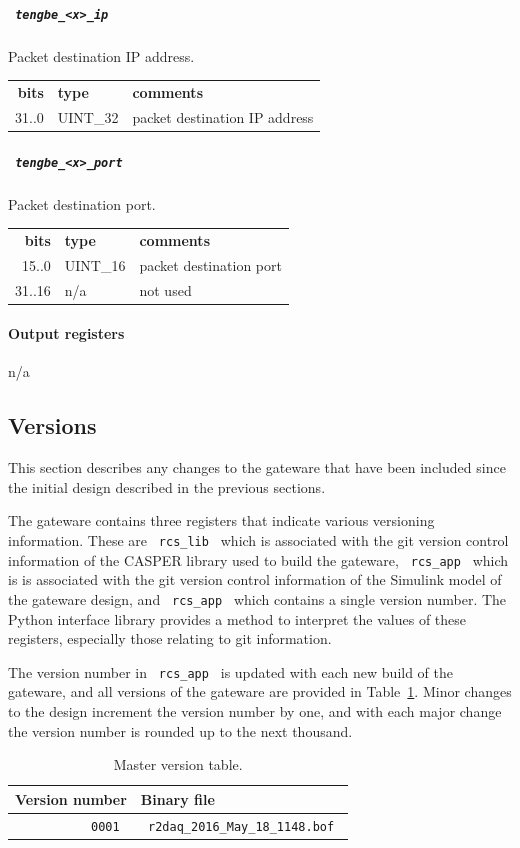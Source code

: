 \documentclass[a4paper,10pt]{article}
\newcommand{\tabref}[1]{Table~\ref{#1}}
\newcommand{\ilcode}[1]{\begingroup
	\setlength{\fboxsep}{1pt}\colorbox{ilcodebg}{\small\tt%
		#1%
	}\endgroup}
\begin{document}
\subparagraph{\ilcode{tengbe\_<x>\_ip}}
Packet destination IP address.\\
\begin{tabular}{rll}
	{\bf bits} & {\bf type} & {\bf comments}\\
	31..0 & UINT\_32     & packet destination IP address
\end{tabular}

\subparagraph{\ilcode{tengbe\_<x>\_port}}
Packet destination port.\\
\begin{tabular}{rll}
	{\bf bits} & {\bf type} & {\bf comments}\\
	 15..0 & UINT\_16     & packet destination port\\
	31..16 & n/a          & not used
\end{tabular}

\paragraph{Output registers}
n/a

\subsection{Versions}
\label{sec:gwver}
This section describes any changes to the gateware that have been 
included since the initial design described in the previous sections.

The gateware contains three registers that indicate various versioning 
information. These are \ilcode{rcs\_lib} which is associated with the 
git version control information of the CASPER library used to build the
gateware, \ilcode{rcs\_app} which is is associated with the git version 
control information of the Simulink model of the gateware design, and 
\ilcode{rcs\_app} which contains a single version number. The Python 
interface library provides a method to interpret the values of these 
registers, especially those relating to git information.

The version number in \ilcode{rcs\_app} is updated with each new build 
of the gateware, and all versions of the gateware are provided in 
\tabref{tab:masterversion}. Minor changes to the design increment the 
version number by one, and with each major change the version number is 
rounded up to the next thousand.

\begin{table}[h]
	\begin{tabular}{rl}
		{\bf Version number} & {\bf Binary file}\\
		\hline
		\ilcode{0001} & \ilcode{r2daq\_2016\_May\_18\_1148.bof}\\
		\hline
		\midrule
	\end{tabular}
	\caption{Master version table.}
	\label{tab:masterversion}
\end{table}
\vspace{\baselineskip}
\end{document}
